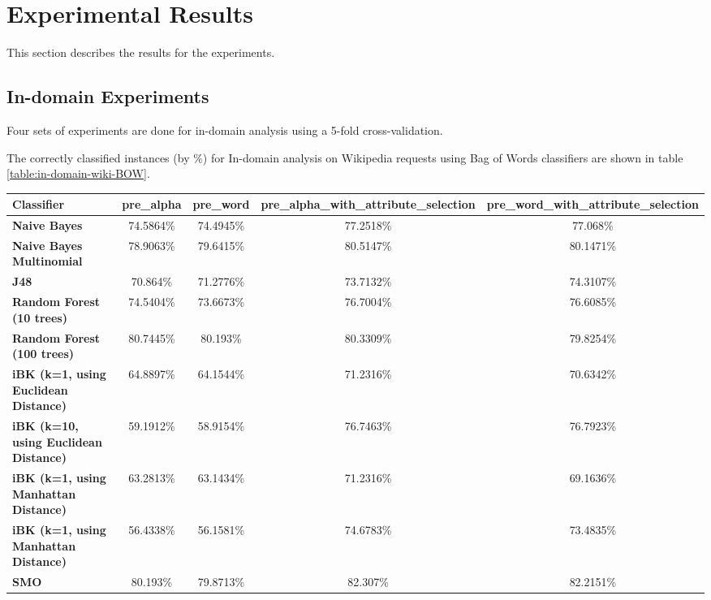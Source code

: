 \documentclass[conference]{IEEEtran}
\begin{document}
\section{Experimental Results}

This section describes the results for the experiments.

\subsection{In-domain Experiments}
Four sets of experiments are done for in-domain analysis using a 5-fold cross-validation. 

The correctly classified instances (by \%) for In-domain analysis on Wikipedia requests using Bag of Words classifiers are shown in table \ref{table:in-domain-wiki-BOW}.

\begin{table*}[htbp]
\caption{In-domain analysis on Wikipedia requests using Bag of Words classifiers }
\centering
\vspace{5pt}
\begin{tabular}{|l|c|c|c|c|}
\hline
\textbf{Classifier} & \textbf{pre\_alpha} & \textbf{pre\_word} & \textbf{pre\_alpha\_with\_attribute\_selection} & \textbf{pre\_word\_with\_attribute\_selection} \\
\hline\hline
\textbf{Naive Bayes} & 74.5864\% & 74.4945\% & 77.2518\% & 77.068\% \\ 
\hline
\textbf{Naive Bayes Multinomial} & 78.9063\% & 79.6415\% & 80.5147\% & 80.1471\% \\ 
\hline
\textbf{J48} & 70.864\% & 71.2776\% & 73.7132\% & 74.3107\% \\ 
\hline
\textbf{Random Forest (10 trees)} & 74.5404\% & 73.6673\% & 76.7004\% & 76.6085\% \\ 
\hline
\textbf{Random Forest (100 trees)} & 80.7445\% & 80.193\% & 80.3309\% & 79.8254\% \\ 
\hline
\textbf{iBK (k=1, using Euclidean Distance)} & 64.8897\% & 64.1544\% & 71.2316\% & 70.6342\% \\ 
\hline
\textbf{iBK (k=10, using Euclidean Distance)} & 59.1912\% & 58.9154\% & 76.7463\% & 76.7923\% \\ 
\hline
\textbf{iBK (k=1, using Manhattan Distance)} & 63.2813\% & 63.1434\% & 71.2316\% & 69.1636\% \\ 
\hline
\textbf{iBK (k=1, using Manhattan Distance)} & 56.4338\% & 56.1581\% & 74.6783\% & 73.4835\% \\ 
\hline
\textbf{SMO} & 80.193\% & 79.8713\% & 82.307\% & 82.2151\% \\ 
\hline
\hline
\end{tabular}
\label{table:in-domain-wiki-BOW}
\end{table*}
\end{document}
